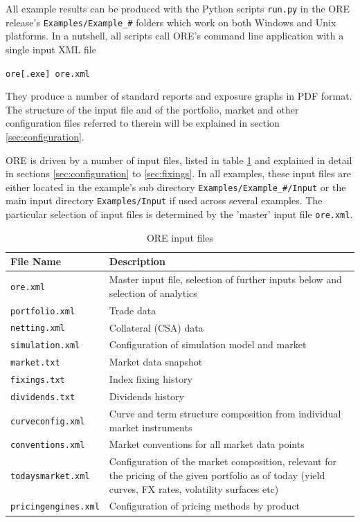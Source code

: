 \documentclass[12pt, a4paper]{article}
\begin{document}
All example results can be produced with the Python scripts {\tt run.py} in the ORE release's {\tt Examples/Example\_\#}
folders which work on both Windows and Unix platforms. In a nutshell, all scripts call ORE's command line application
with a single input XML file

\medskip
\centerline{\tt ore[.exe] ore.xml}
\medskip

They produce a number of standard reports and exposure graphs in PDF format. The structure of the input file and of the
portfolio, market and other configuration files referred to therein will be explained in section
\ref{sec:configuration}.

\medskip ORE is driven by a number of input files, listed in table \ref{tab_1} and explained in detail in sections
\ref{sec:configuration} to \ref{sec:fixings}. In all examples, these input files are either located in the example's sub
directory {\tt Examples/Example\_\#/Input} or the main input directory {\tt Examples/Input} if used across several
examples. The particular selection of input files is determined by the 'master' input file {\tt ore.xml}.

\begin{table}[h]
\scriptsize
\begin{center}
\begin{tabular}{|l|p{11cm}|}
  \hline
  File Name & Description \\
  \hline
  {\tt ore.xml}&   Master input file, selection of further inputs below and selection of analytics \\
  {\tt portfolio.xml} & Trade data \\
  {\tt netting.xml} &  Collateral (CSA) data \\
  {\tt simulation.xml} & Configuration of simulation model and market\\
  {\tt market.txt} &  Market data snapshot \\
  {\tt fixings.txt} &  Index fixing history \\
  {\tt dividends.txt} &  Dividends history \\
  {\tt curveconfig.xml} & Curve and term structure composition from individual market instruments\\
  {\tt conventions.xml} & Market conventions for all market data points\\
  {\tt todaysmarket.xml} &  Configuration of the market composition, relevant for the pricing of the given portfolio as
                           of today (yield curves, FX rates, volatility surfaces etc) \\
  {\tt pricingengines.xml} &  Configuration of pricing methods by product\\
  \hline
\end{tabular}
\end{center}
\caption{ORE input files}
\label{tab_1}
\end{table}
\end{document}
